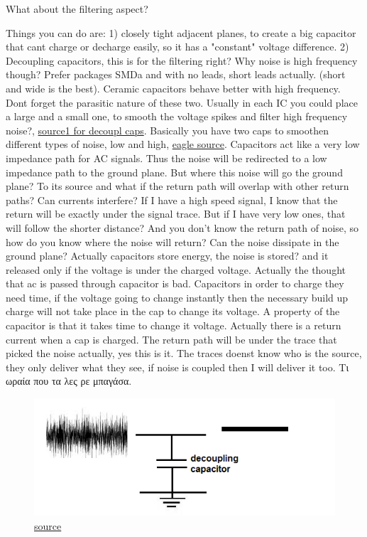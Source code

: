 \documentclass[12pt]{article}
\begin{document}
\begin{itemize}
	What about the filtering aspect?
	
	Things you can do are: 1) closely tight adjacent planes, to create a big capacitor that cant charge or decharge easily, so it has a "constant" voltage difference. 2) Decoupling capacitors, this is for the filtering right? Why noise is high frequency though? Prefer packages SMDa and with no leads, short leads actually. (short and wide is the best). Ceramic capacitors behave better with high frequency. Dont forget the parasitic nature of these two. Usually in each IC you could place a large and a small one, to smooth the voltage spikes and filter high frequency noise?, \href{http://www.capacitorguide.com/coupling-and-decoupling/}{source1 for decoupl caps}. Basically you have two caps to smoothen different types of noise, low and high, \href{https://www.autodesk.com/products/eagle/blog/what-are-decoupling-capacitors/}{eagle source}. Capacitors act like a very low impedance path for AC signals. Thus the noise will be redirected to a low impedance path to the ground plane. But where this noise will go the ground plane? To its source and what if the return path will overlap with other return paths? Can currents interfere? If I have a high speed signal, I know that the return will be exactly under the signal trace. But if I have very low ones, that will follow the shorter distance? And you don't know the return path of noise, so how do you know where the noise will return? Can the noise dissipate in the ground plane? Actually capacitors store energy, the noise is stored? and it released only if the voltage is under the charged voltage. Actually the thought that ac is passed through capacitor is bad. Capacitors in order to charge they need time, if the voltage going to change instantly then the necessary build up charge will not take place in the cap to change its voltage. A property of the capacitor is that it takes time to change it voltage. Actually there is a return current when a cap is charged. The return path will be under the trace that picked the noise actually, yes this is it. The traces doenst know who is the source, they only deliver what they see, if noise is coupled then I will deliver it too. Τι ωραία που τα λες ρε μπαγάσα.
	
	\begin{figure}[h!]
		\centering
		\includegraphics[keepaspectratio, width = \textwidth]{assets/decoupling.png}
		\caption{\href{http://www.learningaboutelectronics.com/Articles/Decoupling-capacitor.php}{source}}
	\end{figure}
	

\end{itemize}
\end{document}
